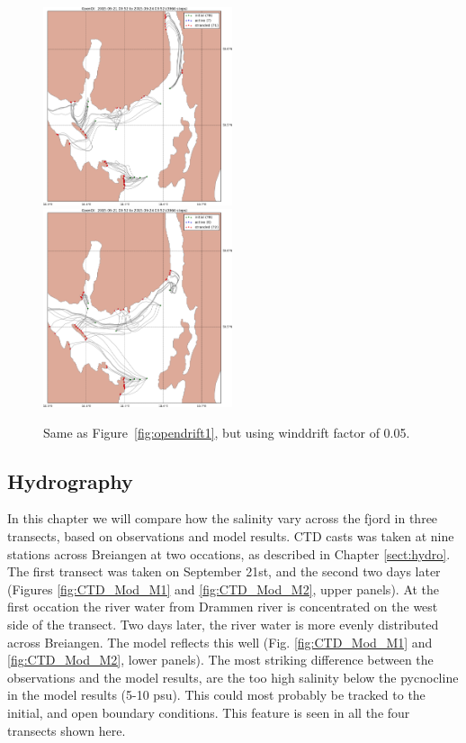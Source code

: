 \documentclass[12pt,a4paper,english]{article}
\begin{document}
\begin{figure}[ht]
\centerline{
\includegraphics*[width=0.495\textwidth]{Opendrift_simulations/LTR3/tokt_drifters_winddrift_0p5_radius_0_num_6_plusminus_2p5h_crop}
\includegraphics*[width=0.495\textwidth]{Opendrift_simulations/LTR3/tokt_drifters_winddrift_0p5_radius_0_num_6_plusminus_2p5h_norkyst_crop}
}
\caption{\small
Same as Figure~\ref{fig:opendrift1}, but using winddrift factor of 0.05.
}
\label{fig:opendrift4}
\end{figure}

\clearpage

\subsection{Hydrography}

In this chapter we will compare how the salinity vary across the fjord in three 
transects, based on observations and model results.
CTD casts was taken at nine stations across Breiangen at two occations, as described in Chapter \ref{sect:hydro}.
The first transect was taken on September 21st, and the second two days later 
(Figures \ref{fig:CTD_Mod_M1} and \ref{fig:CTD_Mod_M2}, upper panels).
At the first occation the river water from Drammen river is concentrated on the 
west side of the transect.
Two days later, the river water is more evenly distributed across Breiangen.
The model reflects this well
(Fig. \ref{fig:CTD_Mod_M1} and \ref{fig:CTD_Mod_M2}, lower panels).
The most striking difference between the observations and the model results,
are the too high salinity below the pycnocline in the model results (5-10 psu).
This could most probably be tracked to the initial, and open boundary conditions.
This feature is seen in all the four transects shown here.
\end{document}
